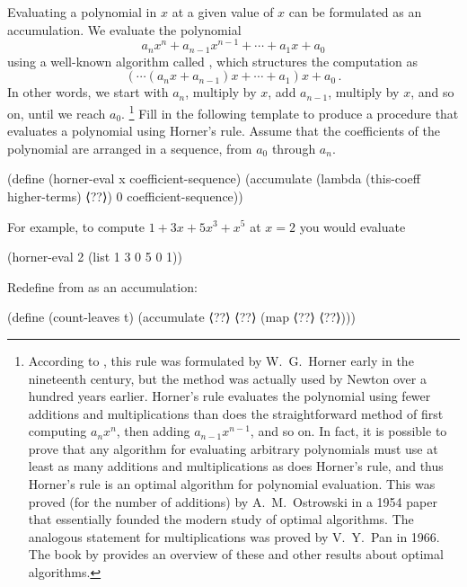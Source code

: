 \begin{exercise}
	\label{Exercise 2.34}
	Evaluating a polynomial in \( x \) at a given value of \( x \) can be formulated as an accumulation.
	We evaluate the polynomial
	\[
		a_n x^n + a_{n-1} x^{n-1} + \dotsb + a_1 x + a_0
	\]
	using a well-known algorithm called , which structures
	the computation as
	\[
		( \dotsm (a_n x + a_{n-1}) x + \dotsb + a_1) x + a_0 \,.
	\]
	In other words, we start with \( a_n \), multiply by \( x \), add
	\( a_{n-1} \), multiply by \( x \), and so on, until we reach
	\( a_0 \).%
	\footnote{
		According to , this rule was formulated by W.~G.~Horner early in the nineteenth century, but the method was actually used by Newton over a hundred years earlier.
		Horner’s rule evaluates the polynomial using fewer additions and multiplications than does the straightforward method of first computing \( a_n x^n \), then adding \( a_{n-1} x^{n-1} \), and so on.
		In fact, it is possible to prove that any algorithm for evaluating arbitrary polynomials must use at least as many additions and multiplications as does Horner’s rule, and thus Horner’s rule is an optimal algorithm for polynomial evaluation.
		This was proved (for the number of additions) by A.~M.~Ostrowski in a 1954 paper that essentially founded the modern study of optimal algorithms.
		The analogous statement for multiplications was proved by V.~Y.~Pan in 1966.
		The book by  provides an overview of these and other results about optimal algorithms.
	}
	Fill in the following template to produce a procedure that evaluates a polynomial using Horner’s rule.
	Assume that the coefficients of the polynomial are arranged in a sequence, from \( a_0 \) through \( a_n \).
	\begin{scheme}
	  (define (horner-eval x coefficient-sequence)
	    (accumulate (lambda (this-coeff higher-terms) ⟨??⟩)
	                0
	                coefficient-sequence))
	\end{scheme}
	For example, to compute \( 1 + 3x + 5x^3 + x^5 \) at \( x = 2 \) you would evaluate
	\begin{scheme}
	  (horner-eval 2 (list 1 3 0 5 0 1))
	\end{scheme}
\end{exercise}



\begin{exercise}
	\label{Exercise 2.35}
	Redefine  from  as an accumulation:
	\begin{scheme}
	  (define (count-leaves t)
	    (accumulate ⟨??⟩ ⟨??⟩ (map ⟨??⟩ ⟨??⟩)))
	\end{scheme}
\end{exercise}



